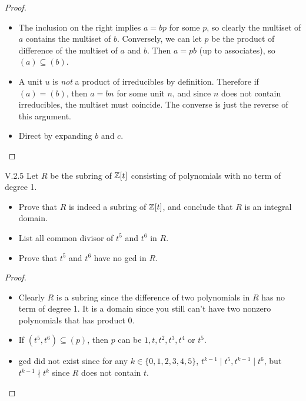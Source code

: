\begin{proof} \
\begin{itemize}	
    \setlength\itemsep{0pt}
    \item The inclusion on the right implies $a = bp$ for some $p$, so clearly the multiset of $a$ contains the multiset of $b$. Conversely, we can let $p$ be the product of difference of the multiset of $a$ and $b$. Then $a = pb$ (up to associates), so $(a)\subseteq(b)$.
    \item A unit $u$ is \emph{not} a product of irreducibles by definition. Therefore if $(a) = (b)$, then $a = bn$ for some unit $n$, and since $n$ does not contain irreducibles, the multiset must coincide. The converse is just the reverse of this argument.
    \item Direct by expanding $b$ and $c$.
\end{itemize}
\end{proof}

\begin{problem}{V.2.5}
Let $R$ be the subring of $\mathbb{Z}[t]$ consisting of polynomials with no term of degree 1.
\begin{itemize}
    \setlength\itemsep{0pt}
    \item Prove that $R$ is indeed a subring of $\mathbb{Z}[t]$, and conclude that $R$ is an integral domain.
    \item List all common divisor of $t^5$ and $t^6$ in $R$.
    \item Prove that $t^5$ and $t^6$ have no gcd in $R$.
\end{itemize}
\end{problem}
\begin{proof} \
\begin{itemize}
    \setlength\itemsep{0pt}
    \item Clearly $R$ is a subring since the difference of two polynomials in $R$ has no term of degree 1. It is a domain since you still can't have two nonzero polynomials that has product $0$.
    \item If $(t^5, t^6) \subseteq (p)$, then $p$ can be $1, t, t^2, t^3, t^4$ or $t^5$.
    \item gcd did not exist since for any $k \in \{0,1,2,3,4,5\}$, $t^{k-1} \mid t^5, t^{k-1} \mid t^6$, but $t^{k-1} \nmid t^k$ since $R$ does not contain $t$.
\end{itemize}
\end{proof}

